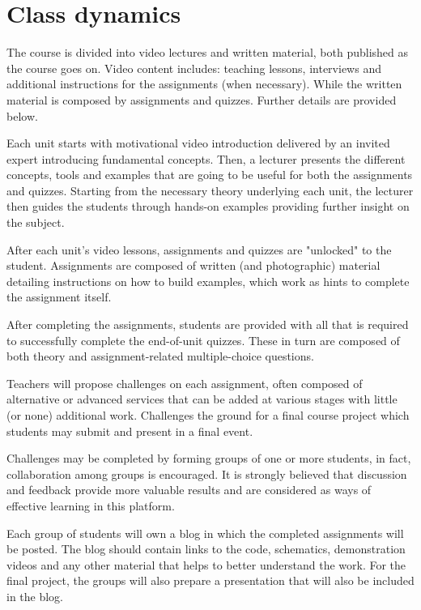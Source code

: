 \documentclass{tufte-book} %
\begin{document}
\section{Class dynamics}

The course is divided into video lectures and written material, both published as the course goes on. Video content includes: teaching lessons, interviews and additional instructions for the assignments (when necessary). While the written material is composed by assignments and quizzes. Further details are provided below.

Each unit starts with motivational video introduction delivered by an invited expert introducing fundamental concepts.
Then, a lecturer presents the different concepts, tools and examples that are going to be useful for both the assignments and quizzes.
Starting from the necessary theory underlying each unit, the lecturer then guides the students through hands-on examples providing further insight on the subject.

After each unit's video lessons, assignments and quizzes are "unlocked" to the student. Assignments are composed of written (and photographic) material detailing instructions on how to build examples, which work as hints to complete the assignment itself.

After completing the assignments, students are provided with all that is required to successfully complete the end-of-unit quizzes. These in turn are composed of both theory and assignment-related multiple-choice questions.

Teachers will propose challenges on each assignment, often composed of alternative or advanced services that can be added at various stages with little (or none) additional work. Challenges the ground for a final course project which students may submit and present in a final event.

Challenges may be completed by forming groups of one or more students, in fact, collaboration among groups is encouraged. It is strongly believed that discussion and feedback provide more valuable results and are considered as ways of effective learning in this platform.

Each group of students will own a blog in which the completed assignments will be posted.
The blog should contain links to the code, schematics, demonstration videos and any other material that helps to better understand the work.
For the final project, the groups will also prepare a presentation that will also be included in the blog.
\end{document}
